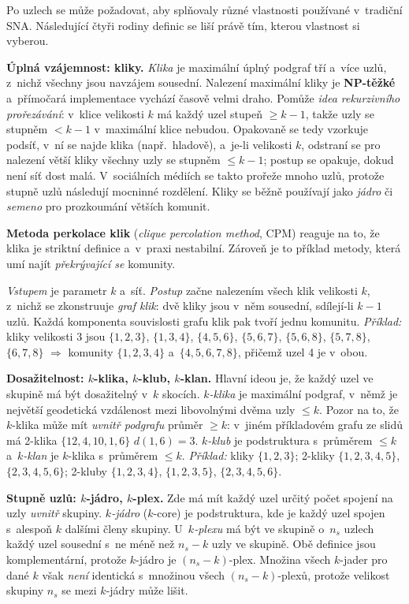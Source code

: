 \documentclass[11pt,a4paper]{article}
\theoremstyle{definition}
\begin{document}
\begin{defbox}
Po uzlech se může požadovat, aby splňovaly různé vlastnosti používané v~tradiční SNA. Následující
čtyři rodiny definic se liší právě tím, kterou vlastnost si vyberou.

\textbf{Úplná vzájemnost: kliky.} \emph{Klika} je maximální úplný podgraf tří a~více uzlů,
z~nichž všechny jsou navzájem sousední. Nalezení maximální kliky je \textbf{NP-těžké}
a~přímočará implementace vychází časově velmi draho. Pomůže \emph{idea rekurzivního
prořezávání}: v~klice velikosti $k$ má každý uzel stupeň $\ge k-1$, takže uzly se stupněm
$<k-1$ v~maximální klice nebudou. Opakovaně se tedy vzorkuje podsíť, v~ní se najde klika (např.\
hladově), a~je-li velikosti $k$, odstraní se pro nalezení větší kliky všechny uzly se stupněm
$\le k-1$; postup se opakuje, dokud není síť dost malá. V~sociálních médiích se takto prořeže
mnoho uzlů, protože stupně uzlů následují mocninné rozdělení. Kliky se běžně používají jako
\emph{jádro} či \emph{semeno} pro prozkoumání větších komunit.

\textbf{Metoda perkolace klik} (\emph{clique percolation method}, CPM) reaguje na to, že klika je
striktní definice a~v~praxi nestabilní. Zároveň je to příklad metody, která umí najít
\emph{překrývající se} komunity.

\emph{Vstupem} je parametr $k$ a~síť. \emph{Postup} začne nalezením všech klik velikosti $k$,
z~nichž se zkonstruuje \emph{graf klik}: dvě kliky jsou v~něm sousední, sdílejí-li $k-1$ uzlů.
Každá komponenta souvislosti grafu klik pak tvoří jednu komunitu.
\emph{Příklad:} kliky velikosti 3 jsou $\{1,2,3\}$, $\{1,3,4\}$, $\{4,5,6\}$,
$\{5,6,7\}$, $\{5,6,8\}$, $\{5,7,8\}$, $\{6,7,8\}$ $\Rightarrow$ komunity $\{1,2,3,4\}$
a~$\{4,5,6,7,8\}$, přičemž uzel 4 je v~obou.

\textbf{Dosažitelnost: $k$-klika, $k$-klub, $k$-klan.} Hlavní ideou je, že každý uzel ve skupině
má být dosažitelný v~$k$ skocích. \emph{$k$-klika} je maximální podgraf, v~němž je největší
geodetická vzdálenost mezi libovolnými dvěma uzly $\le k$. Pozor na to, že $k$-klika může mít
\emph{uvnitř podgrafu} průměr $\ge k$: v~jiném příkladovém grafu ze slidů má 2-klika
$\{12,4,10,1,6\}$ $d(1,6)=3$. \emph{$k$-klub} je podstruktura s~průměrem $\le k$
a~\emph{$k$-klan} je $k$-klika s~průměrem $\le k$. \emph{Příklad:} kliky $\{1,2,3\}$; 2-kliky
$\{1,2,3,4,5\}$, $\{2,3,4,5,6\}$; 2-kluby $\{1,2,3,4\}$, $\{1,2,3,5\}$, $\{2,3,4,5,6\}$.

\textbf{Stupně uzlů: $k$-jádro, $k$-plex.} Zde má mít každý uzel určitý počet spojení na uzly
\emph{uvnitř} skupiny. \emph{$k$-jádro} ($k$-core) je podstruktura, kde je každý uzel spojen
s~alespoň $k$ dalšími členy skupiny. U~\emph{$k$-plexu} má být ve skupině o~$n_s$ uzlech každý
uzel sousední s~ne méně než $n_s-k$ uzly ve skupině. Obě definice jsou komplementární, protože
$k$-jádro je $(n_s-k)$-plex. Množina všech $k$-jader pro dané $k$ však \emph{není} identická
s~množinou všech $(n_s-k)$-plexů, protože velikost skupiny $n_s$ se mezi $k$-jádry může lišit.


\end{defbox}
\end{document}
